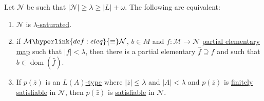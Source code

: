 \documentclass{article}
\DeclareMathOperator{\dom}{dom}
\begin{document}
\begin{nthm}\label{thm:6.5}
  Let $\mathcal{N}$ be such that $|\mathcal{N}| \geq \lambda \geq |L|+\omega$. The following are equivalent:
  \begin{enumerate}[label=(\roman*)]
    \item $\mathcal{N}$ is \hyperlink{def:sat}{$\lambda$-saturated}.
    \item if $\mathcal{M} \hyperlink{def:eleq}{\equiv} \mathcal{N}$, $b \in M$ and $f: \mathcal{M} \to \mathcal{N}$ \hyperlink{def:elmap}{partial elementary map} such that $|f| < \lambda$, then there is a partial elementary $\hat{f} \supseteq f$ and such that $b \in \dom(\hat{f})$.
    \item If $p(\bar{z})$ is an \hyperlink{def:typeparam}{$L(A)$-type} where $|\bar{z}| \leq \lambda$ and $|A| < \lambda$ and $p(\bar{z})$ is \hyperlink{def:type}{finitely satisfiable} in $\mathcal{N}$, then $p(\bar{z})$ is \hyperlink{def:type}{satisfiable} in $\mathcal{N}$.
  \end{enumerate}
\end{nthm}
\end{document}
